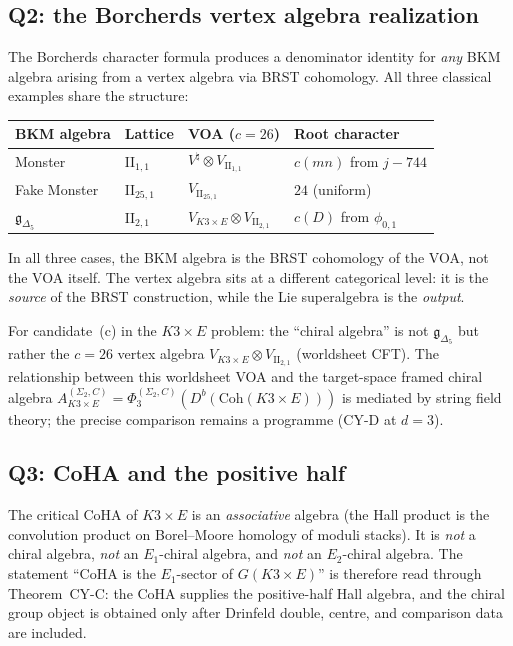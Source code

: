 \subsection{Q2: the Borcherds vertex algebra realization}
\label{subsec:k3e-bkm-q2}

The Borcherds character formula produces a denominator identity for \emph{any} BKM algebra arising from a vertex algebra via BRST cohomology. All three classical examples share the structure:
\begin{center}
\renewcommand{\arraystretch}{1.3}
\begin{tabular}{@{}llll@{}}
\textbf{BKM algebra} & \textbf{Lattice} & \textbf{VOA ($c = 26$)} & \textbf{Root character} \\ \hline
Monster & $\mathrm{II}_{1,1}$ & $V^\natural \otimes V_{\mathrm{II}_{1,1}}$ & $c(mn)$ from $j - 744$ \\
Fake Monster & $\mathrm{II}_{25,1}$ & $V_{\mathrm{II}_{25,1}}$ & $24$ (uniform) \\
$\mathfrak{g}_{\Delta_5}$ & $\mathrm{II}_{2,1}$ & $V_{K3 \times E} \otimes V_{\mathrm{II}_{2,1}}$ & $c(D)$ from $\phi_{0,1}$
\end{tabular}
\end{center}
In all three cases, the BKM algebra is the BRST cohomology of the VOA, not the VOA itself. The vertex algebra sits at a different categorical level: it is the \emph{source} of the BRST construction, while the Lie superalgebra is the \emph{output}.

For candidate~(c) in the $K3 \times E$ problem: the ``chiral algebra'' is not $\mathfrak{g}_{\Delta_5}$ but rather the $c = 26$ vertex algebra $V_{K3 \times E} \otimes V_{\mathrm{II}_{2,1}}$ (worldsheet CFT). The relationship between this worldsheet VOA and the target-space framed chiral algebra $A_{K3 \times E}^{(\Sigma_2,C)} = \Phi_3^{(\Sigma_2,C)}(D^b(\mathrm{Coh}(K3 \times E)))$ is mediated by string field theory; the precise comparison remains a programme (CY-D at $d = 3$).

\subsection{Q3: CoHA and the positive half}
\label{subsec:k3e-bkm-q3}

\begin{remark}
\label{rem:bkm-coha-not-chiral}
The critical CoHA of $K3 \times E$ is an \emph{associative} algebra (the Hall product is the convolution product on Borel--Moore homology of moduli stacks). It is \emph{not} a chiral algebra, \emph{not} an $E_1$-chiral algebra, and \emph{not} an $E_2$-chiral algebra. The statement ``CoHA is the $E_1$-sector of $G(K3 \times E)$'' is therefore read through Theorem~CY-C: the CoHA supplies the positive-half Hall algebra, and the chiral group object is obtained only after Drinfeld double, centre, and comparison data are included.
\end{remark}

